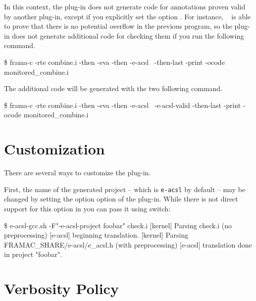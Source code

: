 In this context, the \eacsl plug-in does not generate code for annotations
proven valid by another plug-in, except if you explicitly set the option
. For instance, \Eva~\cite{eva} is able to
prove that there is no potential overflow in the previous program, so the \eacsl
plug-in does not generate additional code for checking them if you run the
following command.
\begin{shell}
\$ frama-c -rte combine.i -then -eva -then -e-acsl \
  -then-last -print -ocode monitored_combine.i
\end{shell}
The additional code will be generated with the two following command.
\begin{shell}
\$ frama-c -rte combine.i -then -eva -then -e-acsl \
  -e-acsl-valid -then-last -print -ocode monitored_combine.i
\end{shell}

\section{Customization} %
\label{sec:custom}

There are several ways to customize the \eacsl plug-in.

First, the name of the generated project -- which is \texttt{e-acsl} by default
-- may be changed by setting the option  option of the
\eacsl plug-in. While there is not direct support for this option in \eacslgcc
you can pass it using \shortopt{F} switch:


\begin{shell}
\$ e-acsl-gcc.sh -F"-e-acsl-project foobar" check.i
[kernel] Parsing check.i (no preprocessing)
[e-acsl] beginning translation.
[kernel] Parsing FRAMAC_SHARE/e-acsl/e_acsl.h (with preprocessing)
[e-acsl] translation done in project "foobar".
\end{shell}

\section{Verbosity Policy} %
\label{sec:verbose}

